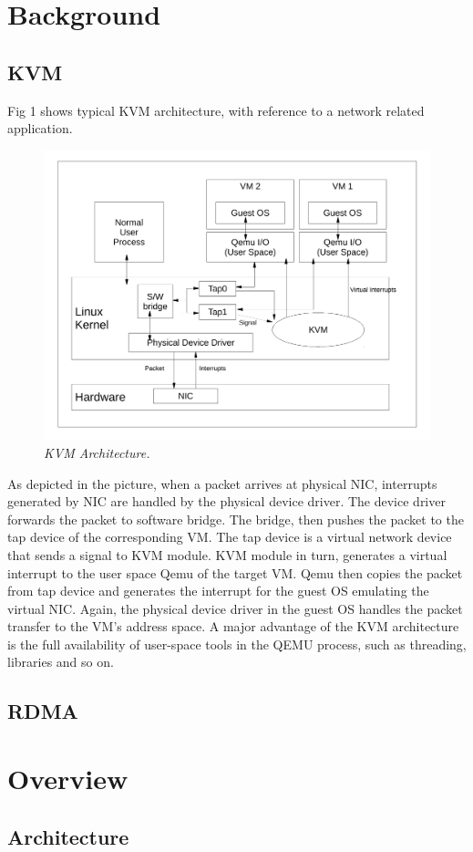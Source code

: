 \section{Background} \label{sec:background}

\subsection{KVM} \label{sec:kvm}

Fig 1 shows typical KVM architecture, with reference to a network related
application. 

\begin{figure}[t]
\centering
\includegraphics[width=.47\textwidth]{figures/kvm}
\vspace{-.2in}
\caption{{\em KVM Architecture.}} \label{fig:arc}
\vspace{.05in}
\end{figure}

As depicted in the picture, when a packet arrives at physical NIC,
interrupts generated by NIC are handled by the physical device driver. The device
driver forwards the packet to software bridge. The bridge, then pushes the packet
to the tap device of the corresponding VM. The tap device is a virtual network
device that sends a signal to KVM module. KVM module in turn, generates a virtual
interrupt to the user space Qemu of the target VM. Qemu then copies the packet from
tap device and generates the interrupt for the guest OS emulating the virtual NIC.
Again, the physical device driver in the guest OS handles the packet transfer to
the VM’s address space. A major advantage of the KVM architecture is the full
availability of user-space tools in the QEMU process, such as threading, libraries
and so on.

\subsection{\paxos}\label{sec:paxos}

\subsection{RDMA} \label{sec:rdma}

\section{\xxx Overview} \label{sec:overview}

\subsection{Architecture} \label{sec:arch}
